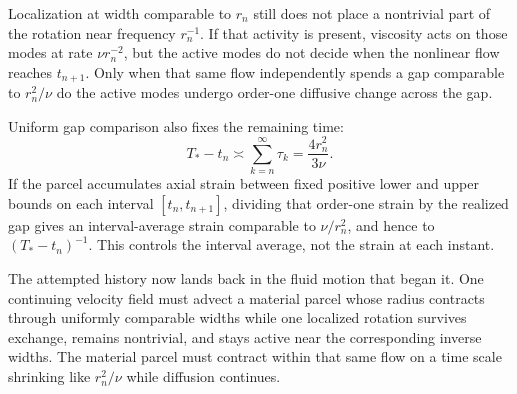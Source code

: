 Localization at width comparable to \(r_n\) still does not place a nontrivial part of the rotation near frequency \(r_n^{-1}\). If that activity is present, viscosity acts on those modes at rate \(\nu r_n^{-2}\), but the active modes do not decide when the nonlinear flow reaches \(t_{n+1}\). Only when that same flow independently spends a gap comparable to \(r_n^2/\nu\) do the active modes undergo order-one diffusive change across the gap.

Uniform gap comparison also fixes the remaining time:
\[
  T_*-t_n
  \asymp
  \sum_{k=n}^{\infty}\tau_k
  =
  \frac{4r_n^2}{3\nu}.
\]
If the parcel accumulates axial strain between fixed positive lower and upper bounds on each interval \([t_n,t_{n+1}]\), dividing that order-one strain by the realized gap gives an interval-average strain comparable to \(\nu/r_n^2\), and hence to \((T_*-t_n)^{-1}\). This controls the interval average, not the strain at each instant.

The attempted history now lands back in the fluid motion that began it. One continuing velocity field must advect a material parcel whose radius contracts through uniformly comparable widths while one localized rotation survives exchange, remains nontrivial, and stays active near the corresponding inverse widths. The material parcel must contract within that same flow on a time scale shrinking like \(r_n^2/\nu\) while diffusion continues.
